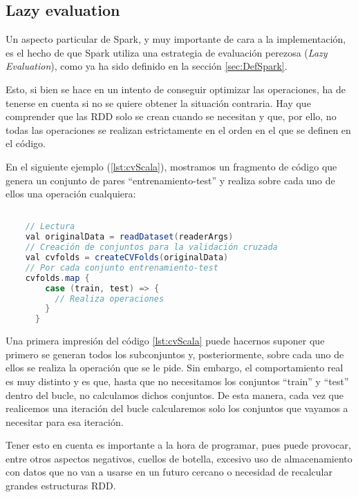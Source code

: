 \subsection{Lazy evaluation}

Un aspecto particular de Spark, y muy importante de cara a la implementación, es el hecho de que Spark utiliza una estrategia de evaluación perezosa (\textit{Lazy Evaluation}), como ya ha sido definido en la sección \ref{sec:DefSpark}.

Esto, si bien se hace en un intento de conseguir optimizar las operaciones, ha de tenerse en cuenta si no se quiere obtener la situación contraria. Hay que comprender que las RDD solo se crean cuando se necesitan y que, por ello, no todas las operaciones se realizan estrictamente en el orden en el que se definen en el código.

En el siguiente ejemplo (\ref{lst:cvScala}), mostramos un fragmento de código que genera un conjunto de pares ``entrenamiento-test'' y realiza sobre cada uno de ellos una operación cualquiera:

\begin{lstlisting}[language=Java,tabsize=4,frame = single,caption=Código de ejecución de una validación cruzada en Scala,captionpos=b,label=lst:cvScala,]

	// Lectura
	val originalData = readDataset(readerArgs)
	// Creación de conjuntos para la validación cruzada
    val cvfolds = createCVFolds(originalData)
    // Por cada conjunto entrenamiento-test
    cvfolds.map {
        case (train, test) => {
          // Realiza operaciones
        }
      }
\end{lstlisting}

Una primera impresión del código \ref{lst:cvScala} puede hacernos suponer que primero se generan todos los subconjuntos y, posteriormente, sobre cada uno de ellos se realiza la operación que se le pide. Sin embargo, el comportamiento real es muy distinto y es que, hasta que no necesitamos los conjuntos ``train'' y ``test'' dentro del bucle, no calculamos dichos conjuntos. De esta manera, cada vez que realicemos una iteración del bucle calcularemos solo los conjuntos que vayamos a necesitar para esa iteración.

Tener esto en cuenta es importante a la hora de programar, pues puede provocar, entre otros aspectos negativos, cuellos de botella, excesivo uso de almacenamiento con datos que no van a usarse en un futuro cercano o necesidad de recalcular grandes estructuras RDD.

